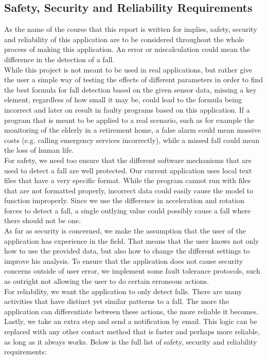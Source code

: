 \documentclass[hidelinks,conference,12pt]{IEEETran}
\begin{document}
\subsection{Safety, Security and Reliability Requirements}
As the name of the course that this report is written for implies, safety, security and reliability of this application are to be considered throughout the whole process of making this application. An error or miscalculation could mean the difference in the detection of a fall. \\
While this project is not meant to be used in real applications, but rather give the user a simple way of testing the effects of different parameters in order to find the best formula for fall detection based on the given sensor data, missing a key element, regardless of how small it may be, could lead to the formula being incorrect and later on result in faulty programs based on this application. If a program that is meant to be applied to a real scenario, such as for example the monitoring of the elderly in a retirement home, a false alarm could mean massive costs (e.g. calling emergency services incorrectly), while a missed fall could mean the loss of human life.\\
For safety, we need too ensure that the different software mechanisms that are used to detect a fall are well protected. Our current application uses local text files that have a very specific format. While the program cannot run with files that are not formatted properly, incorrect data could easily cause the model to function improperly. Since we use the difference in acceleration and rotation forces to detect a fall, a single outlying value could possibly cause a fall where there should not be one.\\
As far as security is concerned, we make the assumption that the user of the application has experience in the field. That means that the user knows not only how to use the provided data, but also how to change the different settings to improve his analysis. To ensure that the application does not cause security concerns outside of user error, we implement some fault tolerance protocols, such as outright not allowing the user to do certain erroneous actions.\\
For reliability, we want the application to only detect falls. There are many activities that have distinct yet similar patterns to a fall. The more the application can differentiate between these actions, the more reliable it becomes. Lastly, we take an extra step and send a notification by email. This logic can be replaced with any other contact method that is faster and perhaps more reliable, as long as it always works. Below is the full list of safety, security and reliability requirements:\\
\end{document}
